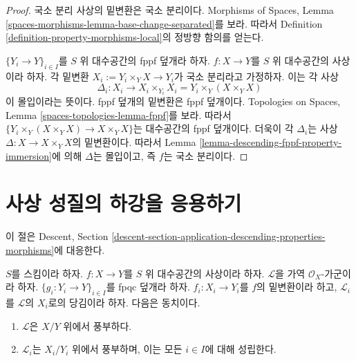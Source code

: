 \begin{proof}
국소 분리 사상의 밑변환은 국소 분리이다. Morphisms of Spaces, Lemma
\ref{spaces-morphisms-lemma-base-change-separated}를 보라. 따라서 Definition
\ref{definition-property-morphisms-local}의 정방향 함의를 얻는다.

\medskip\noindent
$\{Y_i\to Y\}_{i\in I}$를 $S$ 위 대수공간의 fppf 덮개라 하자.
$f:X\to Y$를 $S$ 위 대수공간의 사상이라 하자. 각 밑변환
$X_i:=Y_i\times_YX\to Y_i$가 국소 분리라고 가정하자. 이는 각 사상
$$
\Delta_i :
X_i
\longrightarrow
X_i \times_{Y_i} X_i = Y_i \times_Y (X \times_Y X)
$$
이 몰입이라는 뜻이다. fppf 덮개의 밑변환은 fppf 덮개이다. Topologies
on Spaces, Lemma \ref{spaces-topologies-lemma-fppf}를 보라.
따라서 $\{Y_i\times_Y(X\times_YX)\to X\times_YX\}$는 대수공간의
fppf 덮개이다. 더욱이 각 $\Delta_i$는 사상
$\Delta:X\to X\times_YX$의 밑변환이다. 따라서 Lemma
\ref{lemma-descending-fppf-property-immersion}에 의해 $\Delta$는 몰입이고,
즉 $f$는 국소 분리이다.
\end{proof}

\section{사상 성질의 하강을 응용하기}
\label{section-application-descending-properties-morphisms}

\noindent
이 절은 Descent, Section
\ref{descent-section-application-descending-properties-morphisms}에 대응한다.

\begin{lemma}
\label{lemma-descending-property-ample}
$S$를 스킴이라 하자. $f:X\to Y$를 $S$ 위 대수공간의 사상이라 하자.
$\mathcal{L}$을 가역 $\mathcal{O}_X$-가군이라 하자.
$\{g_i:Y_i\to Y\}_{i\in I}$를 fpqc 덮개라 하자. $f_i:X_i\to Y_i$를
$f$의 밑변환이라 하고, $\mathcal{L}_i$를 $\mathcal{L}$의 $X_i$로의
당김이라 하자. 다음은 동치이다.
\begin{enumerate}
\item $\mathcal{L}$은 $X/Y$ 위에서 풍부하다.
\item $\mathcal{L}_i$는 $X_i/Y_i$ 위에서 풍부하며, 이는 모든 $i\in I$에
대해 성립한다.
\end{enumerate}
\end{lemma}

